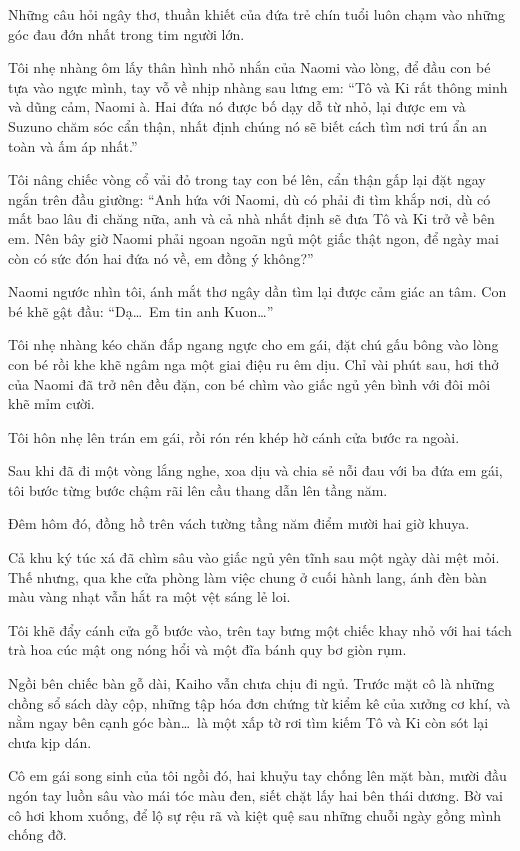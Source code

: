 \documentclass[../main.tex]{subfiles}
\begin{document}
Những câu hỏi ngây thơ, thuần khiết của đứa trẻ chín tuổi luôn chạm vào những góc đau đớn nhất trong tim người lớn.

Tôi nhẹ nhàng ôm lấy thân hình nhỏ nhắn của Naomi vào lòng, để đầu con bé tựa vào ngực mình, tay vỗ về nhịp nhàng sau lưng em: ``Tô và Ki rất thông minh và dũng cảm, Naomi à. Hai đứa nó được bố dạy dỗ từ nhỏ, lại được em và Suzuno chăm sóc cẩn thận, nhất định chúng nó sẽ biết cách tìm nơi trú ẩn an toàn và ấm áp nhất.''

Tôi nâng chiếc vòng cổ vải đỏ trong tay con bé lên, cẩn thận gấp lại đặt ngay ngắn trên đầu giường: ``Anh hứa với Naomi, dù có phải đi tìm khắp nơi, dù có mất bao lâu đi chăng nữa, anh và cả nhà nhất định sẽ đưa Tô và Ki trở về bên em. Nên bây giờ Naomi phải ngoan ngoãn ngủ một giấc thật ngon, để ngày mai còn có sức đón hai đứa nó về, em đồng ý không?''

Naomi ngước nhìn tôi, ánh mắt thơ ngây dần tìm lại được cảm giác an tâm. Con bé khẽ gật đầu: ``Dạ\dots\ Em tin anh Kuon\dots''

Tôi nhẹ nhàng kéo chăn đắp ngang ngực cho em gái, đặt chú gấu bông vào lòng con bé rồi khe khẽ ngâm nga một giai điệu ru êm dịu. Chỉ vài phút sau, hơi thở của Naomi đã trở nên đều đặn, con bé chìm vào giấc ngủ yên bình với đôi môi khẽ mỉm cười.

Tôi hôn nhẹ lên trán em gái, rồi rón rén khép hờ cánh cửa bước ra ngoài.

\ct

Sau khi đã đi một vòng lắng nghe, xoa dịu và chia sẻ nỗi đau với ba đứa em gái, tôi bước từng bước chậm rãi lên cầu thang dẫn lên tầng năm.

Đêm hôm đó, đồng hồ trên vách tường tầng năm điểm mười hai giờ khuya.

Cả khu ký túc xá đã chìm sâu vào giấc ngủ yên tĩnh sau một ngày dài mệt mỏi. Thế nhưng, qua khe cửa phòng làm việc chung ở cuối hành lang, ánh đèn bàn màu vàng nhạt vẫn hắt ra một vệt sáng lẻ loi.

Tôi khẽ đẩy cánh cửa gỗ bước vào, trên tay bưng một chiếc khay nhỏ với hai tách trà hoa cúc mật ong nóng hổi và một đĩa bánh quy bơ giòn rụm.

Ngồi bên chiếc bàn gỗ dài, Kaiho vẫn chưa chịu đi ngủ. Trước mặt cô là những chồng sổ sách dày cộp, những tập hóa đơn chứng từ kiểm kê của xưởng cơ khí, và nằm ngay bên cạnh góc bàn\dots\ là một xấp tờ rơi tìm kiếm Tô và Ki còn sót lại chưa kịp dán.

Cô em gái song sinh của tôi ngồi đó, hai khuỷu tay chống lên mặt bàn, mười đầu ngón tay luồn sâu vào mái tóc màu đen, siết chặt lấy hai bên thái dương. Bờ vai cô hơi khom xuống, để lộ sự rệu rã và kiệt quệ sau những chuỗi ngày gồng mình chống đỡ.
\end{document}
